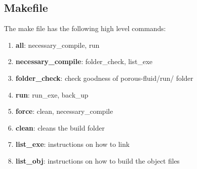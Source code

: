\documentclass[
	12pt
] {article}
\begin{document}
\subsection{Makefile}
	The make file has the following high level commands:
	\begin{enumerate}
		\item \textbf{all}: necessary\_compile, run
		\item \textbf{necessary\_compile}: folder\_check, list\_exe 
		\item \textbf{folder\_check}: check goodness of porous-fluid/run/ folder 
		\item \textbf{run}: run\_exe, back\_up
		\item \textbf{force}: clean, necessary\_compile
		\item \textbf{clean}: cleans the build folder
		\item \textbf{list\_exe}: instructions on how to link
		\item \textbf{list\_obj}: instructions on how to build the object files
	\end{enumerate}
	


\end{document}
